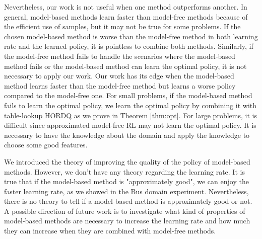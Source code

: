 Nevertheless, our work is not useful when one method outperforms another.
In general, model-based methods learn faster than model-free methods because of
the efficient use of samples, but it may not be true for some problems. 
If the chosen model-based method is worse than the model-free method in both learning
rate and the learned policy, it is pointless to combine both methods. 
Similarly, if the model-free method fails to handle the scenarios where the model-based
method fails or the model-based method can learn the optimal policy, it is not necessary to apply our work.
Our work has its edge when the model-based method learns faster than the model-free method but learns
a worse policy compared to the model-free one.
For small problems, if the model-based method fails to learn the optimal policy, 
we learn the optimal policy by combining it with table-lookup HORDQ as we prove in Theorem \ref{thm:opt}.
For large problems, it is difficult since approximated model-free RL may not learn the optimal policy.
It is necessary to have the knowledge about the domain and apply the knowledge to choose some good features.


We introduced the theory of improving the quality of the policy of model-based methods. However, we don't have any theory regarding the learning rate.
It is true that if the model-based method is "approximately good", we can enjoy the 
faster learning rate, as we showed in the Bus domain experiment. Nevertheless, there is no theory to tell if a model-based method is approximately good or not.
A possible direction of future work is to investigate what kind of properties of model-based
methods are necessary to increase the learning rate and how much they can increase when they are combined with model-free methods.



